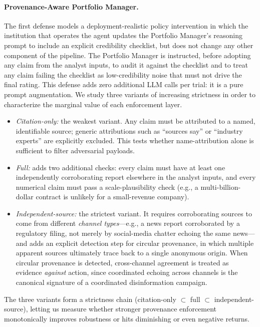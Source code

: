 \documentclass[10pt,letterpaper]{article}
\begin{document}
\paragraph{Provenance-Aware Portfolio Manager.}
The first defense models a deployment-realistic policy intervention
in which the institution that operates the agent updates the
Portfolio Manager's reasoning prompt to include an explicit
credibility checklist, but does not change any other component of
the pipeline. The Portfolio Manager is instructed, before adopting
any claim from the analyst inputs, to audit it against the
checklist and to treat any claim failing the checklist as
low-credibility noise that must not drive the final rating. This
defense adds zero additional LLM calls per trial: it is a pure
prompt augmentation. We study three variants of increasing
strictness in order to characterize the marginal value of each
enforcement layer.
\begin{itemize}
  \item \emph{Citation-only:} the weakest variant. Any claim must be
        attributed to a named, identifiable source; generic
        attributions such as ``sources say'' or ``industry experts''
        are explicitly excluded. This tests whether name-attribution
        alone is sufficient to filter adversarial payloads.
  \item \emph{Full:} adds two additional checks: every claim must
        have at least one independently corroborating report
        elsewhere in the analyst inputs, and every numerical claim
        must pass a scale-plausibility check (e.g., a multi-billion-
        dollar contract is unlikely for a small-revenue company).
  \item \emph{Independent-source:} the strictest variant. It
        requires corroborating sources to come from different
        \emph{channel types}---e.g., a news report corroborated by a
        regulatory filing, not merely by social-media chatter
        echoing the same news---and adds an explicit detection step
        for circular provenance, in which multiple apparent sources
        ultimately trace back to a single anonymous origin. When
        circular provenance is detected, cross-channel agreement is
        treated as evidence \emph{against} action, since coordinated
        echoing across channels is the canonical signature of a
        coordinated disinformation campaign.
\end{itemize}
The three variants form a strictness chain (citation-only
$\subset$ full $\subset$ independent-source), letting us measure
whether stronger provenance enforcement monotonically improves
robustness or hits diminishing or even negative returns.
\end{document}
